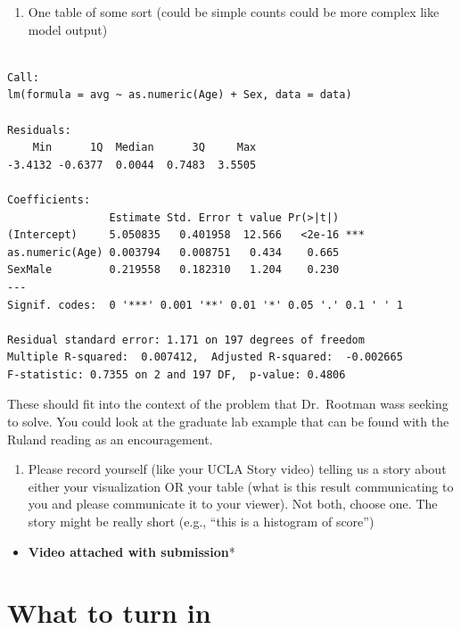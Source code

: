 \documentclass[
  letterpaper,
  DIV=11,
  numbers=noendperiod]{scrartcl}
\providecommand{\tightlist}{%
  \setlength{\itemsep}{0pt}\setlength{\parskip}{0pt}}\usepackage{longtable,booktabs,array}
\begin{document}
\begin{enumerate}
\def\labelenumi{\arabic{enumi}.}
\setcounter{enumi}{1}
\tightlist
\item
  One table of some sort (could be simple counts could be more complex
  like model output)
\end{enumerate}

\begin{verbatim}

Call:
lm(formula = avg ~ as.numeric(Age) + Sex, data = data)

Residuals:
    Min      1Q  Median      3Q     Max 
-3.4132 -0.6377  0.0044  0.7483  3.5505 

Coefficients:
                Estimate Std. Error t value Pr(>|t|)    
(Intercept)     5.050835   0.401958  12.566   <2e-16 ***
as.numeric(Age) 0.003794   0.008751   0.434    0.665    
SexMale         0.219558   0.182310   1.204    0.230    
---
Signif. codes:  0 '***' 0.001 '**' 0.01 '*' 0.05 '.' 0.1 ' ' 1

Residual standard error: 1.171 on 197 degrees of freedom
Multiple R-squared:  0.007412,  Adjusted R-squared:  -0.002665 
F-statistic: 0.7355 on 2 and 197 DF,  p-value: 0.4806
\end{verbatim}

These should fit into the context of the problem that Dr.~Rootman wass
seeking to solve. You could look at the graduate lab example that can be
found with the Ruland reading as an encouragement.

\begin{enumerate}
\def\labelenumi{\arabic{enumi}.}
\setcounter{enumi}{2}
\tightlist
\item
  Please record yourself (like your UCLA Story video) telling us a story
  about either your visualization OR your table (what is this result
  communicating to you and please communicate it to your viewer). Not
  both, choose one. The story might be really short (e.g., ``this is a
  histogram of score'')
\end{enumerate}

\begin{itemize}
\tightlist
\item
  \textbf{Video attached with submission}*
\end{itemize}

\section{What to turn in}\label{what-to-turn-in}
\end{document}
